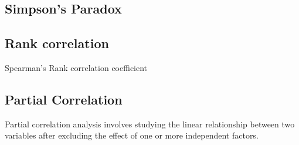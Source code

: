 \documentclass[a4paper,12pt]{article}
\begin{document}
\subsection{Simpson's Paradox}
\subsection{Rank correlation}
Spearman's Rank correlation coefficient


\subsection{Partial Correlation}
Partial correlation analysis involves studying the linear relationship between two variables after excluding the effect of one or more independent factors.
\end{document}
